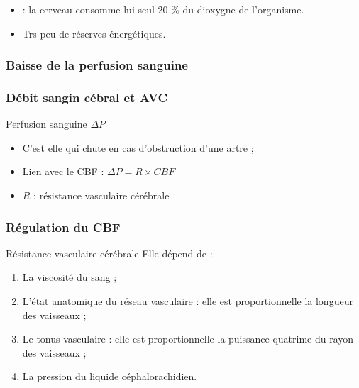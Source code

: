\begin{frame}
\begin{itemize}
\item<+-> \cite{pat_neu} : la cerveau consomme  lui seul 20 \% du dioxygne de l'organisme.
\item<+-> Trs peu de r\'eserves \'energ\'etiques.
\end{itemize}
\end{frame}

\subsubsection{Baisse de la perfusion sanguine}

\begin{frame}
\frametitle{D\'ebit sangin c\'ebral et AVC}
\begin{block}{Perfusion sanguine $\Delta P$}
\begin{itemize}
\item<+-> C'est elle qui chute en cas d'obstruction d'une artre ;
\item<+-> Lien avec le CBF : $\Delta P = R\times CBF$ \cite{vib_dsc}
\item<+-> $R$ : r\'esistance vasculaire c\'er\'ebrale
\end{itemize}
\end{block}
\end{frame}

\subsubsection{R\'egulation du CBF}

\begin{frame}
\begin{block}{R\'esistance vasculaire c\'er\'ebrale \cite{vib_dsc}}
Elle d\'epend de :
%
\begin{enumerate}
\item<+-> La viscosit\'e du sang ;
\item<+-> L'\'etat anatomique du r\'eseau vasculaire : elle est proportionnelle  la longueur des vaisseaux ;
\item<+-> Le tonus vasculaire : elle est proportionnelle  la puissance quatrime du rayon des vaisseaux ;
\item<+-> La pression du liquide c\'ephalorachidien.
\end{enumerate}
\end{block}
\end{frame}

